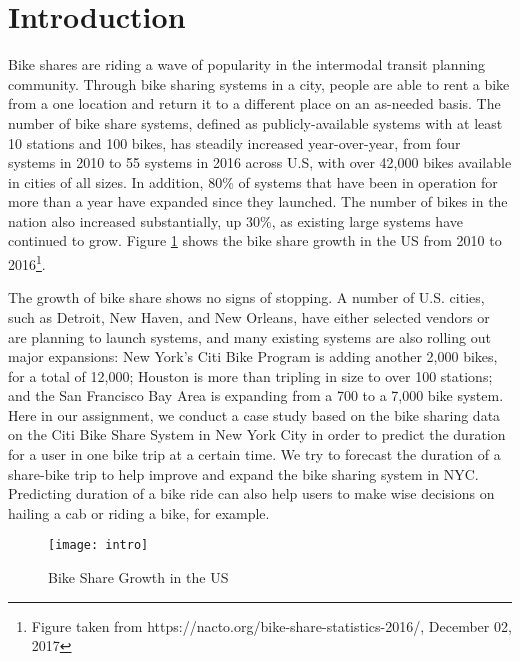 \section{Introduction}

  \par Bike shares are riding a wave of popularity in the intermodal transit planning community. Through bike sharing systems in a city, people are able to rent a bike from a one location and return it to a different place on an as-needed basis. The number of bike share systems, defined as publicly-available systems with at least 10 stations and 100 bikes, has steadily increased year-over-year, from four systems in 2010 to 55 systems in 2016 across U.S, with over 42,000 bikes available in cities of all sizes\cite{us}. In addition, 80\% of systems that have been in operation for more than a year have expanded since they launched. The number of bikes in the nation also increased substantially, up 30\%, as existing large systems have continued to grow. Figure \ref{fig_intro} shows the bike share growth in the US from 2010 to 2016\footnote{Figure taken from https://nacto.org/bike-share-statistics-2016/, December 02, 2017}.
  \par The growth of bike share shows no signs of stopping. A number of U.S. cities, such as Detroit, New Haven, and New Orleans, have either selected vendors or are planning to launch systems, and many existing systems are also rolling out major expansions: New York's Citi Bike Program \cite{bike} is adding another 2,000 bikes, for a total of 12,000; Houston is more than tripling in size to over 100 stations; and the San Francisco Bay Area is expanding from a 700 to a 7,000 bike system\cite{spread}. Here in our assignment, we conduct a case study based on the bike sharing data on the Citi Bike Share System in New York City in order to predict the duration for a user in one bike trip at a certain time. We try to forecast the duration of a share-bike trip to help improve and expand the bike sharing system in NYC. Predicting duration of a bike ride can also help users to make wise decisions on hailing a cab or riding a bike, for example. 

  \begin{figure}[h]
  \centering
  \texttt{[image: intro]}
  \caption{Bike Share Growth in the US}
  \label{fig_intro}
  \end{figure}

